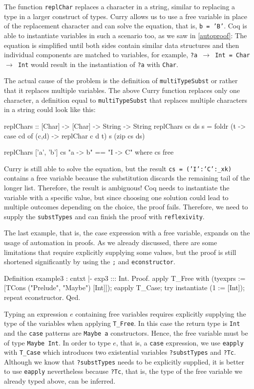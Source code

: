 \documentclass[paper = a4, fleqn, abstract=on, twoside]{scrreprt}
\begin{document}
The function \texttt{replChar} replaces a character in a string, similar to replacing a type in a larger construct of types. Curry allows us to use a free variable in place of the replacement character and can solve the equation, that is, \texttt{{b = 'B'}}. Coq is able to instantiate variables in such a scenario too, as we saw in \autoref{autoproof}: The equation is simplified until both sides contain similar data structures and then individual components are matched to variables, for example, \texttt{?a $\rightarrow$ Int = Char $\rightarrow$ Int} would result in the instantiation of \texttt{?a} with \texttt{Char}.
\par
The actual cause of the problem is the definition of \texttt{multiTypeSubst} or rather that it replaces multiple variables. The above Curry function replaces only one character, a definition equal to \texttt{multiTypeSubst} that replaces multiple characters in a string could look like this:
\begin{haskellcode}
replChars :: [Char] -> [Char] -> String -> String
replChars cs ds s =  foldr (\cd t -> case cd of (c,d) -> replChar c d t)
                           s (zip cs ds)
                    
replChars ['a', 'b'] cs "a -> b" == "I -> C" where cs free
\end{haskellcode}
Curry is still able to solve the equation, but the result \texttt{{cs = ('I':'C':\_xk)}} contains a free variable because the substitution discards the remaining tail of the longer list. Therefore, the result is ambiguous! Coq needs to instantiate the variable with a specific value, but since choosing one solution could lead to multiple outcomes depending on the choice, the proof fails. Therefore, we need to supply the \texttt{substTypes} and can finish the proof with \texttt{reflexivity}.\\
\par
The last example, that is, the case expression with a free variable, expands on the usage of automation in proofs. As we already discussed, there are some limitations that require explicitly supplying some values, but the proof is still shortened significantly by using the \texttt{;} and \texttt{econstructor}.
\begin{coqcode}
Definition example3 : cntxt |- exp3 ::: Int.
  Proof.
  apply T_Free with (tyexprs := [TCons ("Prelude", "Maybe") [Int]]);
  eapply T_Case;
  try instantiate (1 := [Int]);
  repeat econstructor.
Qed.
\end{coqcode}
Typing an expression $e$ containing free variables requires explicitly supplying the type of the variables when applying \texttt{T\_Free}. In this case the return type is \texttt{Int} and the \texttt{case} patterns are \texttt{Maybe a} constructors. Hence, the free variable must be of type \texttt{Maybe Int}. In order to type $e$, that is, a \texttt{case} expression, we use \texttt{eapply} with \texttt{T\_Case} which introduces two existential variables \texttt{?substTypes} and \texttt{?Tc}. Although we know that \texttt{?substTypes} needs to be explicitly supplied, it is better to use \texttt{eapply} nevertheless because \texttt{?Tc}, that is, the type of the free variable we already typed above, can be inferred.
\end{document}
